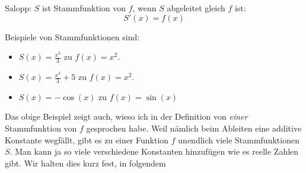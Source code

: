 \documentclass[%
<<<<<<< Updated upstream
<<<<<<< Updated upstream
11pt,%
twoside,%
titlepage,%
german,%
headsepline%
]{scrartcl}
\begin{document}
\begin{bem}
Salopp: $S$ ist Stammfunktion von $f$, wenn $S$ abgeleitet gleich $f$ ist:
$$S'(x)=f(x)$$
\end{bem}

\begin{bsps}
Beispiele von Stammfunktionen sind:
\begin{itemize}
\item $S(x)=\frac{x^3}{3}$ zu $f(x)=x^2$.
\item $S(x)=\frac{x^3}{3}+5$ zu $f(x)=x^2$.
\item $S(x)=-\cos(x)$ zu $f(x)=\sin(x)$
\end{itemize}
\end{bsps}

Das obige Beispiel zeigt auch, wieso ich in der Definition von \emph{einer} Stammfunktion von $f$ gesprochen habe. Weil nämlich beim Ableiten eine additive Konstante wegfällt, gibt es zu einer Funktion $f$ unendlich viele Stammfunktionen $S$. Man kann ja so viele verschiedene Konstanten hinzufügen wie es reelle Zahlen gibt. Wir halten dies kurz fest, in folgendem
\end{document}
